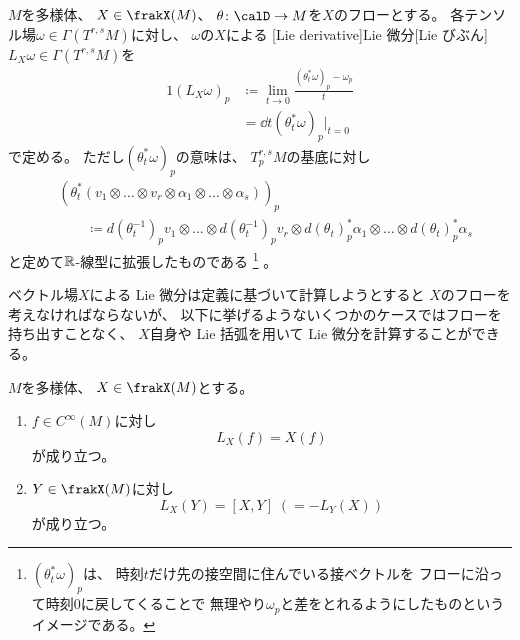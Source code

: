 \documentclass[report]{jlreq}
\begin{document}
\begin{definition}[Lie 微分]
    $M$を多様体、
    $X \in \frakX(M)$、
    $\theta \colon \calD \to M$を$X$のフローとする。
    各テンソル場$\omega \in \Gamma(T^{r, s} M)$に対し、
    $\omega$の$X$による
    [Lie derivative]{Lie 微分}[Lie びぶん]
    $L_X \omega \in \Gamma(T^{r, s} M)$を
    \begin{alignat}{1}
        (L_X \omega)_p
            &\coloneqq \lim_{t \to 0} \frac{(\theta_t^* \omega)_p - \omega_p}{t} \\
            &= \dd{t} (\theta_t^* \omega)_p \Big|_{t = 0}
    \end{alignat}
    で定める。
    ただし$(\theta_t^* \omega)_p$の意味は、
    $T_p^{r, s} M$の基底に対し
    \begin{align}
        &(\theta_t^* (
            v_1 \otimes \dots \otimes v_r \otimes \alpha_1 \otimes \dots \otimes \alpha_s
        ))_p \\
        &\qquad \coloneqq
            d(\theta^{-1}_t)_p v_1 \otimes \dots \otimes d(\theta^{-1}_t)_p v_r
            \otimes
            d(\theta_t)_p^* \alpha_1 \otimes \dots \otimes d(\theta_t)_p^* \alpha_s
    \end{align}
    と定めて$\mathbb{R}$-線型に拡張したものである
    \footnote{
        $(\theta_t^* \omega)_p$は、
        時刻$t$だけ先の接空間に住んでいる接ベクトルを
        フローに沿って時刻$0$に戻してくることで
        無理やり$\omega_p$と差をとれるようにしたものというイメージである。
    }
    。
\end{definition}

ベクトル場$X$による Lie 微分は定義に基づいて計算しようとすると
$X$のフローを考えなければならないが、
以下に挙げるようないくつかのケースではフローを持ち出すことなく、
$X$自身や Lie 括弧を用いて Lie 微分を計算することができる。

\begin{proposition}
    $M$を多様体、
    $X \in \frakX(M)$とする。
    \begin{enumerate}
        \item $f \in C^{\infty}(M)$に対し
            \begin{equation}
                L_X(f) = X(f)
            \end{equation}
            が成り立つ。
        \item $Y \in \frakX(M)$に対し
            \begin{equation}
                L_X(Y) = [X, Y] \; (= - L_Y(X))
            \end{equation}
            が成り立つ。
    \end{enumerate}
\end{proposition}
\end{document}
